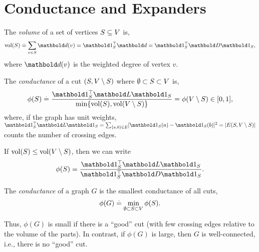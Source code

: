 
\chapter{Conductance and Expanders}

\begin{defn}[Volume] The \emph{volume} of a set of vertices $S \subseteq V$ is, \begin{align}
    \vol(S) \defeq \sum_{v \in \sS} \vd(v) = \trans{\vOne_\sS}\vd = \trans{\vOne_\sS}\mD\vOne_\sS,
\end{align} where $\vd(v)$ is the weighted degree of vertex $v$.
\end{defn}

\begin{defn} The \emph{conductance} of a cut $(S, V \setminus S)$ where $\emptyset \subset S \subset V$ is, \begin{align}
    \phi(\sS) \defeq \frac{\trans{\vOne_\sS}\mL\vOne_\sS}{\min\{\vol(\sS), \vol(\sV \setminus \sS)\}} = \phi(\sV \setminus \sS) \in [0,1],
\end{align} where, if the graph has unit weights, $\trans{\vOne_\sS}\mL\vOne_\sS = \sum_{\{a,b\}\in\sE} [\vOne_\sS(a) - \vOne_\sS(b)]^2 = |\sE(\sS, \sV \setminus \sS)|$ counts the number of crossing edges.
\end{defn}

\begin{rmk}
If $\mathrm{vol}(S) \leq \mathrm{vol}(V \setminus S)$, then we can write \begin{align}
    \phi(\sS) = \frac{\trans{\vOne_\sS}\mL\vOne_\sS}{\trans{\vOne_\sS}\mD\vOne_\sS}.
\end{align}
\end{rmk}

\begin{defn}The \emph{conductance} of a graph $G$ is the smallest conductance of all cuts, \begin{align}
    \phi(G) \overset{.}{=} \min_{\emptyset \subset S \subset V} \phi(S).
\end{align}
\end{defn} Thus, $\phi(G)$ is small if there is a ``good'' cut (with few crossing edges relative to the volume of the parts). In contrast, if $\phi(G)$ is large, then $G$ is well-connected, i.e., there is no ``good'' cut.

